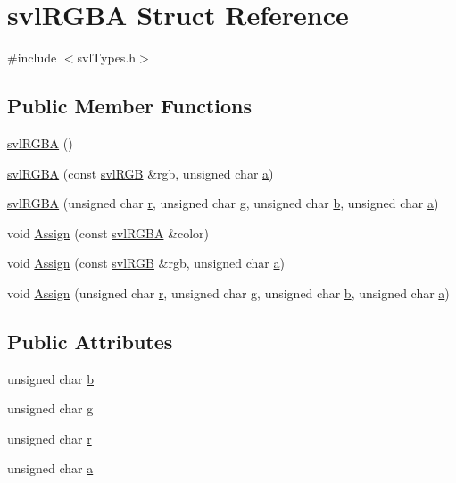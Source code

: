 \hypertarget{structsvl_r_g_b_a}{\section{svl\-R\-G\-B\-A Struct Reference}
\label{structsvl_r_g_b_a}
}


{\ttfamily \#include $<$svl\-Types.\-h$>$}

\subsection*{Public Member Functions}
\begin{DoxyCompactItemize}
\item 
\hyperlink{structsvl_r_g_b_a_a77a335beeeafa24e617e9ca764c421d7}{svl\-R\-G\-B\-A} ()
\item 
\hyperlink{structsvl_r_g_b_a_ae163b898a73c688b4f8a7f234fbc6538}{svl\-R\-G\-B\-A} (const \hyperlink{structsvl_r_g_b}{svl\-R\-G\-B} \&rgb, unsigned char \hyperlink{structsvl_r_g_b_a_a013e40506e5c6adcec1dc614b2634c76}{a})
\item 
\hyperlink{structsvl_r_g_b_a_a314c3f93830210f37ea3060192d923f3}{svl\-R\-G\-B\-A} (unsigned char \hyperlink{structsvl_r_g_b_a_a851a1703a424dd9d4330eb669094e991}{r}, unsigned char \hyperlink{structsvl_r_g_b_a_a367a65b4b35bc3b855a6d818c843d02f}{g}, unsigned char \hyperlink{structsvl_r_g_b_a_a7c139a15f87df0e403d602573029f063}{b}, unsigned char \hyperlink{structsvl_r_g_b_a_a013e40506e5c6adcec1dc614b2634c76}{a})
\item 
void \hyperlink{structsvl_r_g_b_a_ac7059121c29b2ac38b101b3908d408ed}{Assign} (const \hyperlink{structsvl_r_g_b_a}{svl\-R\-G\-B\-A} \&color)
\item 
void \hyperlink{structsvl_r_g_b_a_a7fd2cd35b305bb6d95ed5a98f500565d}{Assign} (const \hyperlink{structsvl_r_g_b}{svl\-R\-G\-B} \&rgb, unsigned char \hyperlink{structsvl_r_g_b_a_a013e40506e5c6adcec1dc614b2634c76}{a})
\item 
void \hyperlink{structsvl_r_g_b_a_a43f30bf0bfadabc00f7d0a4dbeb22ceb}{Assign} (unsigned char \hyperlink{structsvl_r_g_b_a_a851a1703a424dd9d4330eb669094e991}{r}, unsigned char \hyperlink{structsvl_r_g_b_a_a367a65b4b35bc3b855a6d818c843d02f}{g}, unsigned char \hyperlink{structsvl_r_g_b_a_a7c139a15f87df0e403d602573029f063}{b}, unsigned char \hyperlink{structsvl_r_g_b_a_a013e40506e5c6adcec1dc614b2634c76}{a})
\end{DoxyCompactItemize}
\subsection*{Public Attributes}
\begin{DoxyCompactItemize}
\item 
unsigned char \hyperlink{structsvl_r_g_b_a_a7c139a15f87df0e403d602573029f063}{b}
\item 
unsigned char \hyperlink{structsvl_r_g_b_a_a367a65b4b35bc3b855a6d818c843d02f}{g}
\item 
unsigned char \hyperlink{structsvl_r_g_b_a_a851a1703a424dd9d4330eb669094e991}{r}
\item 
unsigned char \hyperlink{structsvl_r_g_b_a_a013e40506e5c6adcec1dc614b2634c76}{a}
\end{DoxyCompactItemize}


